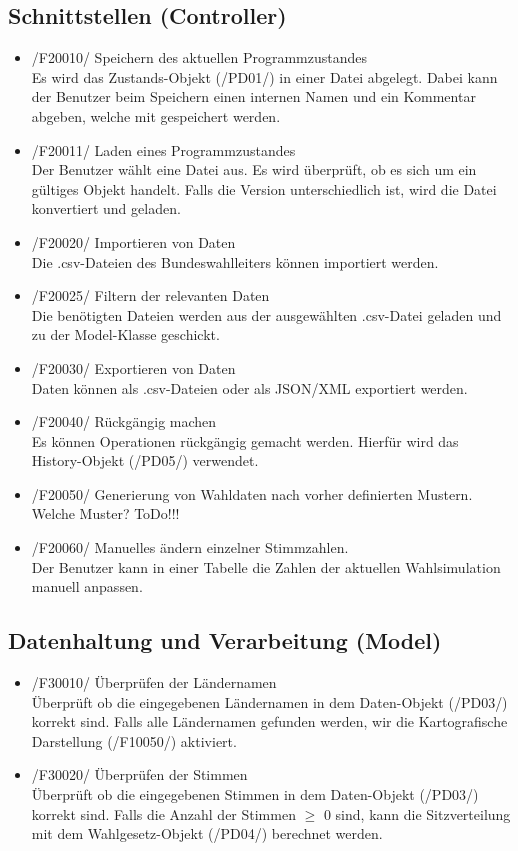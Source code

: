 \documentclass[10pt,a4paper]{article}
\begin{document}
\subsection{Schnittstellen (Controller)}
\begin{itemize}
	\item /F20010/ Speichern des aktuellen Programmzustandes \hfill \\
	Es wird das Zustands-Objekt (/PD01/) in einer Datei abgelegt. Dabei kann der Benutzer beim Speichern einen internen Namen und ein Kommentar abgeben, welche mit gespeichert werden.
	\item /F20011/ Laden eines Programmzustandes \hfill \\
	Der Benutzer wählt eine Datei aus. Es wird überprüft, ob es sich um ein gültiges Objekt handelt. Falls die Version unterschiedlich ist, wird die Datei konvertiert und geladen.
	\item /F20020/ Importieren von Daten \hfill \\
	Die .csv-Dateien des Bundeswahlleiters können importiert werden.
	\item /F20025/ Filtern der relevanten Daten \hfill \\
	Die benötigten Dateien werden aus der ausgewählten .csv-Datei geladen und zu der Model-Klasse geschickt.
	\item /F20030/ Exportieren von Daten \hfill \\
	Daten können als .csv-Dateien oder als JSON/XML exportiert werden.
	\item /F20040/ Rückgängig machen \hfill \\
	Es können Operationen rückgängig gemacht werden. Hierfür wird das History-Objekt (/PD05/) verwendet.
	\item /F20050/ Generierung von Wahldaten nach vorher definierten Mustern. \hfill \\
	Welche Muster? ToDo!!!
	\item /F20060/ Manuelles ändern einzelner Stimmzahlen. \hfill \\
	Der Benutzer kann in einer Tabelle die Zahlen der aktuellen Wahlsimulation manuell anpassen.
\end{itemize}

\subsection{Datenhaltung und Verarbeitung (Model)}
\begin{itemize}
	\item /F30010/ Überprüfen der Ländernamen \hfill \\
	Überprüft ob die eingegebenen Ländernamen in dem Daten-Objekt (/PD03/) korrekt sind. Falls alle Ländernamen gefunden werden, wir die Kartografische Darstellung (/F10050/) aktiviert.
	\item /F30020/ Überprüfen der Stimmen\hfill \\
	Überprüft ob die eingegebenen Stimmen in dem Daten-Objekt (/PD03/) korrekt sind. Falls die Anzahl der Stimmen $\geq$ 0 sind, kann die Sitzverteilung mit dem Wahlgesetz-Objekt (/PD04/) berechnet werden.
\end{itemize}
\end{document}
